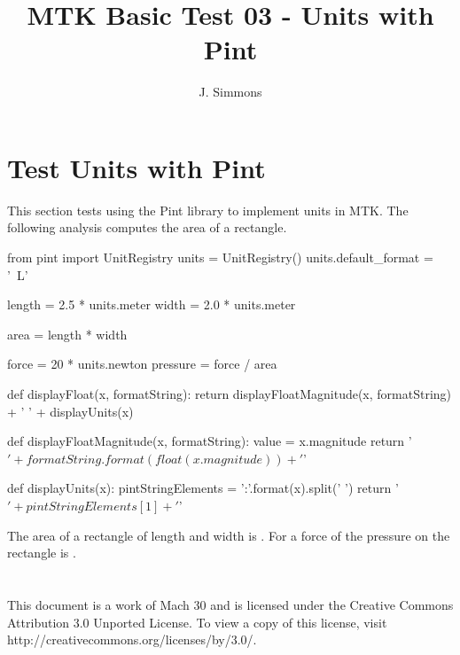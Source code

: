 \documentclass{article}
\title{MTK Basic Test 03 - Units with Pint}
\author{J. Simmons}
\begin{document}
\maketitle

\section{Test Units with Pint}
This section tests using the Pint library to implement units in MTK.  The following analysis computes the area of a rectangle.

\begin{sageblock}
from pint import UnitRegistry
units = UnitRegistry()
units.default_format = '~L'

length = 2.5 * units.meter
width = 2.0 * units.meter

area = length * width

force = 20 * units.newton
pressure = force / area

def displayFloat(x, formatString):
  return displayFloatMagnitude(x, formatString) + ' ' + displayUnits(x)
  
def displayFloatMagnitude(x, formatString):
  value = x.magnitude
  return '$' + formatString.format(float(x.magnitude)) + '$'
  
def displayUnits(x):
  pintStringElements = '{:}'.format(x).split(' ')
  return '$' + pintStringElements[1] + '$'
  
\end{sageblock}

The area of a rectangle of length  and width  is .  For a force of  the pressure on the rectangle is .

\section*{}
This document is a work of Mach 30 and is licensed under the Creative Commons Attribution 3.0 Unported License. To view a copy of this license, visit http://creativecommons.org/licenses/by/3.0/.
\end{document}
